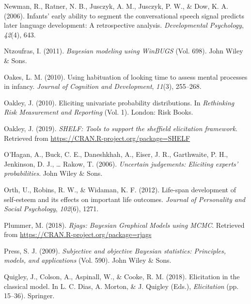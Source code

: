 \documentclass[openright,titlepage,12pt,a4paper]{book}
\begin{document}
\leavevmode\hypertarget{ref-newman_infants_2006}{}%
Newman, R., Ratner, N. B., Jusczyk, A. M., Jusczyk, P. W., \& Dow, K. A. (2006). Infants' early ability to segment the conversational speech signal predicts later language development: A retrospective analysis. \emph{Developmental Psychology}, \emph{42}(4), 643.

\leavevmode\hypertarget{ref-ntzoufras_bayesian_2011}{}%
Ntzoufras, I. (2011). \emph{Bayesian modeling using WinBUGS} (Vol. 698). John Wiley \& Sons.

\leavevmode\hypertarget{ref-oakes_using_2010}{}%
Oakes, L. M. (2010). Using habituation of looking time to assess mental processes in infancy. \emph{Journal of Cognition and Development}, \emph{11}(3), 255--268.

\leavevmode\hypertarget{ref-oakley_eliciting_2010}{}%
Oakley, J. (2010). Eliciting univariate probability distributions. In \emph{Rethinking Risk Measurement and Reporting} (Vol. 1). London: Risk Books.

\leavevmode\hypertarget{ref-R-SHELF}{}%
Oakley, J. (2019). \emph{SHELF: Tools to support the sheffield elicitation framework}. Retrieved from \url{https://CRAN.R-project.org/package=SHELF}

\leavevmode\hypertarget{ref-ohagan_uncertain_2006}{}%
O'Hagan, A., Buck, C. E., Daneshkhah, A., Eiser, J. R., Garthwaite, P. H., Jenkinson, D. J., \ldots{} Rakow, T. (2006). \emph{Uncertain judgements: Eliciting experts' probabilities}. John Wiley \& Sons.

\leavevmode\hypertarget{ref-orth_life-span_2012}{}%
Orth, U., Robins, R. W., \& Widaman, K. F. (2012). Life-span development of self-esteem and its effects on important life outcomes. \emph{Journal of Personality and Social Psychology}, \emph{102}(6), 1271.

\leavevmode\hypertarget{ref-plummer_rjags:_2018}{}%
Plummer, M. (2018). \emph{Rjags: Bayesian Graphical Models using MCMC}. Retrieved from \url{https://CRAN.R-project.org/package=rjags}

\leavevmode\hypertarget{ref-press_subjective_2009}{}%
Press, S. J. (2009). \emph{Subjective and objective Bayesian statistics: Principles, models, and applications} (Vol. 590). John Wiley \& Sons.

\leavevmode\hypertarget{ref-quigley_elicitation_2018}{}%
Quigley, J., Colson, A., Aspinall, W., \& Cooke, R. M. (2018). Elicitation in the classical model. In L. C. Dias, A. Morton, \& J. Quigley (Eds.), \emph{Elicitation} (pp. 15--36). Springer.
\end{document}
